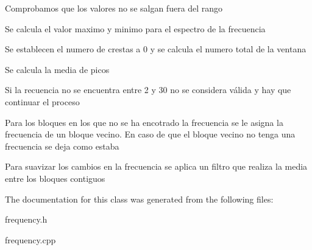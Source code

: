 Comprobamos que los valores no se salgan fuera del rango

Se calcula el valor maximo y minimo para el espectro de la frecuencia

Se establecen el numero de crestas a 0 y se calcula el numero total de la ventana

Se calcula la media de picos

Si la recuencia no se encuentra entre 2 y 30 no se considera válida y hay que continuar el proceso

Para los bloques en los que no se ha encotrado la frecuencia se le asigna la frecuencia de un bloque vecino. En caso de que el bloque vecino no tenga una frecuencia se deja como estaba

Para suavizar los cambios en la frecuencia se aplica un filtro que realiza la media entre los bloques contiguos

The documentation for this class was generated from the following files\+:\begin{DoxyCompactItemize}
\item 
frequency.\+h\item 
frequency.\+cpp\end{DoxyCompactItemize}
